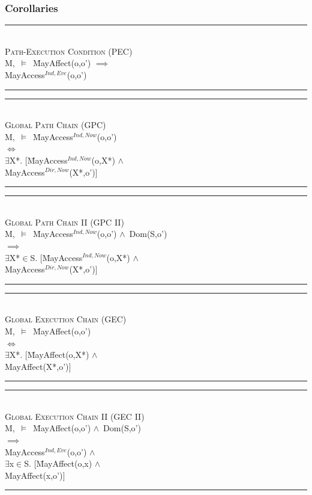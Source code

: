 \documentclass[a4paper,11pt, twoside,twocolumn]{article}
\newenvironment{logic}
{\begin{minipage}[c]{\linewidth}  \small \vspace{0.5em}\begin{tabbing}}
{\end{tabbing}\end{minipage}\vspace{0.5em}}
\newcommand{\loin}{$\in$}
\newcommand{\loexists}{$\exists$}
\newcommand{\loand}{$\land$}
\newcommand{\loimplies}{$\implies$}
\newcommand{\losigma}{\text{$\upsigma$}}
\newcommand{\loturns} {$\vDash$}
\newcommand{\loiff} {$\iff$}
\newcommand{\hr}{\rule{\linewidth}{0.4pt}}
\begin{document}
\subsubsection{Corollaries}

\begin{logic}
\hr\\
\textsc{\normalsize *Path-Execution Condition (PEC)}\\\vspace{0.5em}
M,\losigma\ \loturns\
\= MayAffect(o,o') \loimplies \\
\> MayAccess$^{Ind,Eve}$(o,o')\\
\hr
\end{logic}

\begin{logic}
\hr\\
\textsc{\normalsize *Global Path Chain (GPC)}\\
M,\losigma\ \loturns\ \=MayAccess$^{Ind,Now}$(o,o')\\
\>\loiff\\
\>\loexists X*. $[$\=MayAccess$^{Ind,Now}$(o,X*) \loand\\
\>\> MayAccess$^{Dir,Now}$(X*,o')$]$\\
\hr
\end{logic}

\begin{logic}
\hr\\
\textsc{\normalsize *Global Path Chain II (GPC II)}\\
M,\losigma\ \loturns\ \=MayAccess$^{Ind,Now}$(o,o') \loand\ Dom(S,o')\\
\>\loimplies\\
\>\loexists X*\loin{S}. $[$\=MayAccess$^{Ind,Now}$(o,X*) \loand\\
\>\> MayAccess$^{Dir,Now}$(X*,o')$]$\\
\hr
\end{logic}

\begin{logic}
\hr\\
\textsc{\normalsize *Global Execution Chain (GEC)}\\
M,\losigma\ \loturns\ \=MayAffect(o,o')\\
\> \loiff\\
\> \loexists X*. $[$\=MayAffect(o,X*) \loand\\
\>\>MayAffect(X*,o')$]$\\
\hr
\end{logic}

\begin{logic}
\hr\\
\textsc{\normalsize *Global Execution Chain II (GEC II)}\\
M,\losigma\ \loturns\ \=MayAffect(o,o') \loand\ Dom(S,o')\\
\> \loimplies\\
\> MayAccess$^{Ind,Eve}$(o,o') \loand\\
\> \loexists x\loin{S}. $[$\=MayAffect(o,x) \loand\\
\> \>MayAffect(x,o')$]$\\
\hr
\end{logic}
\end{document}
